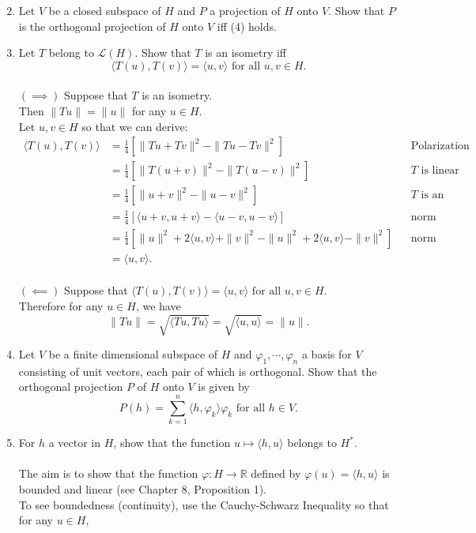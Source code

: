 \begin{enumerate}
\[    \]
    \item Let $V$ be a closed subspace of $H$ and $P$ a projection of $H$ onto $V$. Show that $P$ is the orthogonal projection of $H$ onto $V$ iff (4) holds.
    \item Let $T$ belong to $\mathcal{L}(H)$. Show that $T$ is an isometry iff
    \[
        \langle T(u),T(v)\rangle=\langle u,v\rangle\text{ for all }u,v\in H.
    \]
    \\$(\implies)$ Suppose that $T$ is an isometry.
    \\Then $\|Tu\|=\|u\|$ for any $u\in H$.
    \\Let $u,v\in H$ so that we can derive:
    \begin{align*}
        \langle T(u),T(v)\rangle&=\frac{1}{4}[\|Tu+Tv\|^2-\|Tu-Tv\|^2]&&\text{Polarization identity}\\
        &=\frac{1}{4}[\|T(u+v)\|^2-\|T(u-v)\|^2]&&T\text{ is linear}\\
        &=\frac{1}{4}[\|u+v\|^2-\|u-v\|^2]&&T\text{ is an isometry}\\
        &=\frac{1}{4}[\langle u+v,u+v\rangle-\langle u-v,u-v\rangle]&&\text{norm induced by inner product}\\
        &=\frac{1}{4}[\|u\|^2+2\langle u,v\rangle+\|v\|^2-\|u\|^2+2\langle u,v\rangle-\|v\|^2]&&\text{norm induced by inner product}\\
        &=\langle u,v\rangle.
    \end{align*}
    \\$(\impliedby)$ Suppose that $\langle T(u),T(v)\rangle=\langle u,v\rangle\text{ for all }u,v\in H$.
    \\Therefore for any $u\in H$, we have 
    \[
        \|Tu\|=\sqrt{\langle Tu,Tu\rangle}=\sqrt{\langle u,u\rangle}=\|u\|.
    \]
    \item Let $V$ be a finite dimensional subspace of $H$ and $\varphi_1,\cdots,\varphi_n$ a basis for $V$ consisting of unit vectors, each pair of which is orthogonal. Show that the orthogonal projection $P$ of $H$ onto $V$ is given by 
    \[
        P(h)=\sum_{k=1}^n\langle h,\varphi_k\rangle\varphi_k\text{ for all }h\in V.
    \]
    \item For $h$ a vector in $H$, show that the function $u\mapsto\langle h,u\rangle$ belongs to $H^*$.\\
    \\The aim is to show that the function $\varphi:H\to\mathbb{R}$ defined by $\varphi(u)=\langle h,u\rangle$ is bounded and linear (see Chapter 8, Proposition 1).
    \\To see boundedness (continuity), use the Cauchy-Schwarz Inequality so that for any $u\in H$,

\end{enumerate}
